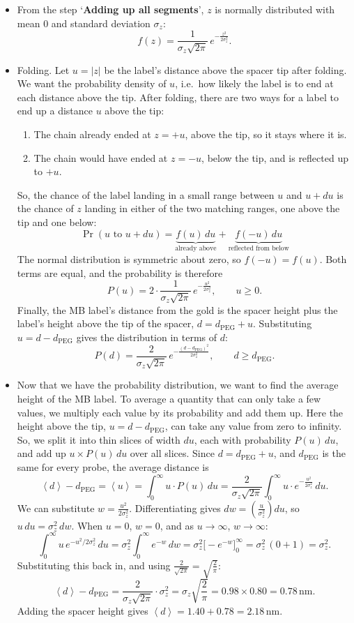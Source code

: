 \documentclass[10pt,a4paper]{article}
\numberwithin{equation}{section}
\newcommand{\nm}{\,\mathrm{nm}}
\newcommand{\dpeg}{d_{\mathrm{PEG}}}
\newcommand{\avg}[1]{\left\langle #1\right\rangle}
\newcommand{\dropdown}{\par\medskip}
\begin{document}
\dropdown
\begin{itemize}
  \item From the step `\textbf{Adding up all segments}', $z$ is normally distributed with mean $0$ and standard deviation $\sigma_z$:
  \[ f(z) = \frac{1}{\sigma_z\sqrt{2\pi}}\,e^{-\frac{z^2}{2\sigma_z^2}}. \]
  \item Folding. Let $u = |z|$ be the label's distance above the spacer tip after folding. We want the probability density of $u$, i.e.\ how likely the label is to end at each distance above the tip. After folding, there are two ways for a label to end up a distance $u$ above the tip:
  \begin{enumerate}
    \item The chain already ended at $z = +u$, above the tip, so it stays where it is.
    \item The chain would have ended at $z = -u$, below the tip, and is reflected up to $+u$.
  \end{enumerate}
  So, the chance of the label landing in a small range between $u$ and $u + du$ is the chance of $z$ landing in either of the two matching ranges, one above the tip and one below:
  \[ \Pr(u \text{ to } u + du) = \underbrace{f(u)\,du}_{\text{already above}} + \underbrace{f(-u)\,du}_{\text{reflected from below}} \]
  The normal distribution is symmetric about zero, so $f(-u) = f(u)$. Both terms are equal, and the probability is therefore
  \[ P(u) = 2\cdot\frac{1}{\sigma_z\sqrt{2\pi}}\,e^{-\frac{u^2}{2\sigma_z^2}}, \qquad u \ge 0. \]
  Finally, the MB label's distance from the gold is the spacer height plus the label's height above the tip of the spacer, $d = \dpeg + u$. Substituting $u = d - \dpeg$ gives the distribution in terms of $d$:
  \[ P(d) = \frac{2}{\sigma_z\sqrt{2\pi}}\,e^{-\frac{(d-\dpeg)^2}{2\sigma_z^2}}, \qquad d \ge \dpeg. \]
  \item Now that we have the probability distribution, we want to find the average height of the MB label. To average a quantity that can only take a few values, we multiply each value by its probability and add them up. Here the height above the tip, $u = d - \dpeg$, can take any value from zero to infinity. So, we split it into thin slices of width $du$, each with probability $P(u)\,du$, and add up $u\times P(u)\,du$ over all slices. Since $d = \dpeg + u$, and $\dpeg$ is the same for every probe, the average distance is
  \[ \avg{d} - \dpeg = \avg{u} = \int_0^\infty u\cdot P(u)\,du = \frac{2}{\sigma_z\sqrt{2\pi}}\int_0^\infty u\cdot e^{-\frac{u^2}{2\sigma_z^2}}\,du. \]
  We can substitute $w = \frac{u^2}{2\sigma_z^2}$. Differentiating gives $dw = \left(\frac{u}{\sigma_z^2}\right)du$, so $u\,du = \sigma_z^2\,dw$. When $u = 0$, $w = 0$, and as $u\to\infty$, $w\to\infty$:
  \[ \int_0^\infty u\,e^{-u^2/2\sigma_z^2}\,du = \sigma_z^2\int_0^\infty e^{-w}\,dw = \sigma_z^2\big[-e^{-w}\big]_0^\infty = \sigma_z^2\,(0+1) = \sigma_z^2. \]
  Substituting this back in, and using $\frac{2}{\sqrt{2\pi}} = \sqrt{\frac{2}{\pi}}$:
  \[ \avg{d} - \dpeg = \frac{2}{\sigma_z\sqrt{2\pi}}\cdot\sigma_z^2 = \sigma_z\sqrt{\frac{2}{\pi}} = 0.98\times0.80 = 0.78\nm. \]
  Adding the spacer height gives $\avg{d} = 1.40 + 0.78 = 2.18\nm$.
\end{itemize}
\end{document}
